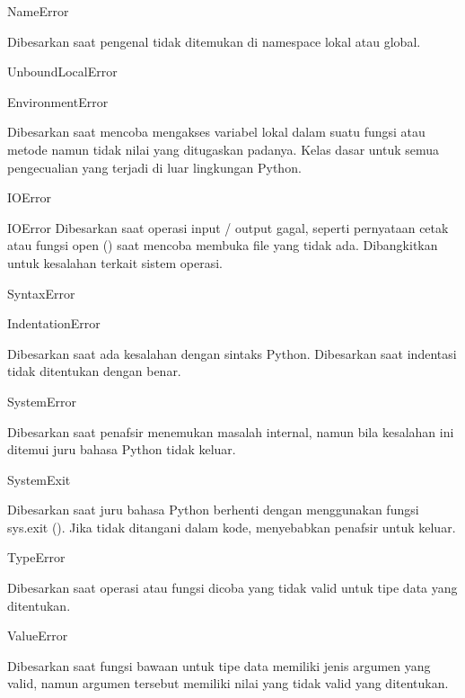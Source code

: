 NameError \hspace*{0.5in}  \hspace*{0.5in}  

Dibesarkan saat pengenal tidak ditemukan di namespace lokal atau global. 
\vspace{12pt}

UnboundLocalError 

EnvironmentError \hspace*{0.5in}  
 
Dibesarkan saat mencoba mengakses variabel lokal dalam suatu fungsi atau metode namun tidak nilai yang ditugaskan padanya. Kelas dasar untuk semua pengecualian yang terjadi di luar lingkungan Python. 
\vspace{12pt}

IOError 

IOError Dibesarkan saat operasi input / output gagal, seperti pernyataan cetak atau fungsi open () saat mencoba membuka file yang tidak ada. Dibangkitkan untuk kesalahan terkait sistem operasi. 
\vspace{12pt}
 
SyntaxError 

IndentationError \hspace*{0.5in}  

Dibesarkan saat ada kesalahan dengan sintaks Python. Dibesarkan saat indentasi tidak ditentukan dengan benar. 

SystemError \hspace*{0.5in}  

Dibesarkan saat penafsir menemukan masalah internal, namun bila kesalahan ini ditemui juru bahasa Python tidak keluar. 
\vspace{12pt}

SystemExit \hspace*{0.5in}  

Dibesarkan saat juru bahasa Python berhenti dengan menggunakan fungsi sys.exit (). Jika tidak ditangani dalam kode, menyebabkan penafsir untuk keluar. 
\vspace{12pt}

TypeError \hspace*{0.5in}  

Dibesarkan saat operasi atau fungsi dicoba yang tidak valid untuk tipe data yang ditentukan. 
\vspace{12pt}

ValueError \hspace*{0.5in}  

Dibesarkan saat fungsi bawaan untuk tipe data memiliki jenis argumen yang valid, namun argumen tersebut memiliki nilai yang tidak valid yang ditentukan. 
\vspace{12pt}

